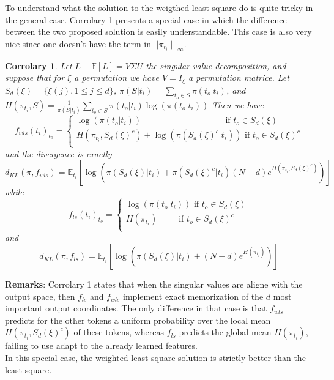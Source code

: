 \documentclass{article}
\newtheorem{corro}{Corrolary}
\begin{document}
To understand what the solution to the weigthed least-square do is quite tricky in the general case. Corrolary 1 presents a special
case in which the difference between the two proposed solution is easily understandable. This case is also very nice since one doesn't 
have the term in $||\pi_{t_i}||_{-\infty}$. 
\bigbreak

\begin{corro}
    Let $L-\mathbb{E}[L] = V\Sigma U$ the singular value decomposition, and suppose that for $\xi$ a permutation we have $V=I_{\xi}$ a permutation matrice. 
    Let $S_{d}(\xi) = \{\xi(j), 1\leq j\leq d\}$, $\pi(S|{t_i}) = \sum_{{t_o}\in S}\pi({t_o}|{t_i})$, 
    and $H(\pi_{t_i}, S) = \frac{1}{\pi(S|{t_i})}\sum_{{t_o}\in S}\pi({t_o}|{t_i})\log(\pi({t_o}|{t_i}))$
    Then we have
    \[f_{wls}({t_i})_{t_o} = \begin{cases}\log(\pi({t_o}|{t_i}))\,\,\,\,\,\,\,\,\,\,\,\,\,\,\,\,\,\,\,\,\,\,\,\,\,\,\,\,\,\,\,\,\,\,\,\,\,\,\,\,\,\,\,\,\,\,\,\,\,\,\,\,\,\,\,\,\, \text{ if } {t_o}\in S_{d}(\xi)\\
        H(\pi_{t_i}, S_{d}(\xi)^c)+\log(\pi(S_{d}(\xi)^c|{t_i}))\text{ if } {t_o}\in S_{d}(\xi)^c\\ \end{cases}\]
    and the divergence is exactly
    \[d_{KL}(\pi, f_{wls}) = \mathbb{E}_{t_i}\left[\log\left(\pi(S_{d}(\xi)|{t_i})+\pi(S_{d}(\xi)^c|{t_i})(N-d)e^{H(\pi_{t_i}, S_{d}(\xi)^c)}\right)\right] \]
    while
    \[f_{ls}({t_i})_{t_o} = \begin{cases}\log(\pi({t_o}|{t_i})) \text{ if } {t_o}\in S_{d}(\xi)\\
        H(\pi_{t_i})\,\,\,\,\,\,\,\,\,\,\,\,\,\text{ if } {t_o}\in S_{d}(\xi)^c\\ \end{cases}\]
    and
    \[d_{KL}(\pi, f_{ls}) = \mathbb{E}_{t_i}\left[\log\left(\pi(S_{d}(\xi)|{t_i})+(N-d)e^{H(\pi_{t_i})}\right)\right] \]
\end{corro}
\bigbreak

\textbf{Remarks}: Corrolary 1 states that when the singular values are aligne with the output space, then $f_{ls}$ and $f_{wls}$ implement 
exact memorization of the $d$ most important output coordinates. The only difference in that case is that $f_{wls}$ predicts for the 
other tokens a uniform probability over the local mean $H(\pi_{t_i}, S_{d}(\xi)^c)$ of these tokens, whereas $f_{ls}$ predicts the
global mean $H(\pi_{t_i})$, failing to use adapt to the already learned features.\\
In this special case, the weighted least-square solution is strictly better than the least-square.
\bigbreak
\end{document}

